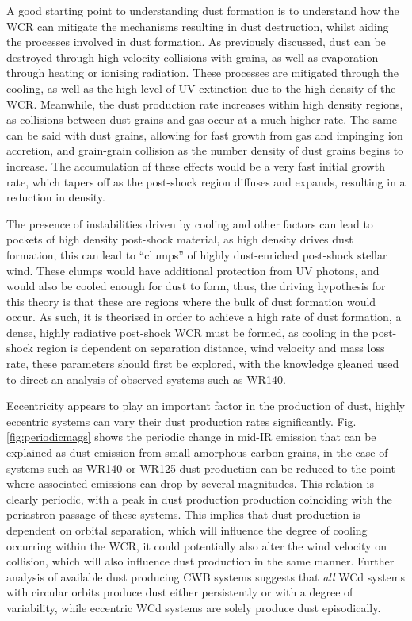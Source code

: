 A good starting point to understanding dust formation is to understand how the WCR can mitigate the mechanisms resulting in dust destruction, whilst aiding the processes involved in dust formation.
As previously discussed, dust can be destroyed through high-velocity collisions with grains, as well as evaporation through heating or ionising radiation.
These processes are mitigated through the cooling, as well as the high level of UV extinction due to the high density of the WCR.
Meanwhile, the dust production rate increases within high density regions, as collisions between dust grains and gas occur at a much higher rate.
The same can be said with dust grains, allowing for fast growth from gas and impinging ion accretion, and grain-grain collision as the number density of dust grains begins to increase.
The accumulation of these effects would be a very fast initial growth rate, which tapers off as the post-shock region diffuses and expands, resulting in a reduction in density.

The presence of instabilities driven by cooling and other factors can lead to pockets of high density post-shock material, as high density drives dust formation, this can lead to ``clumps'' of highly dust-enriched post-shock stellar wind.
These clumps would have additional protection from UV photons, and would also be cooled enough for dust to form, thus, the driving hypothesis for this theory is that these are regions where the bulk of dust formation would occur.
As such, it is theorised in order to achieve a high rate of dust formation, a dense, highly radiative post-shock WCR must be formed, as cooling in the post-shock region is dependent on separation distance, wind velocity and mass loss rate, these parameters should first be explored, with the knowledge gleaned used to direct an analysis of observed systems such as WR140.

Eccentricity appears to play an important factor in the production of dust, highly eccentric systems can vary their dust production rates significantly.
Fig. \ref{fig:periodicmags} shows the periodic change in mid-IR emission that can be explained as dust emission from small amorphous carbon grains, in the case of systems such as WR140 or WR125 dust production can be reduced to the point where associated emissions can drop by several magnitudes.
This relation is clearly periodic, with a peak in dust production production coinciding with the periastron passage of these systems.
This implies that dust production is dependent on orbital separation, which will influence the degree of cooling occurring within the WCR, it could potentially also alter the wind velocity on collision, which will also influence dust production in the same manner.
Further analysis of available dust producing CWB systems suggests that \textit{all} WCd systems with circular orbits produce dust either persistently or with a degree of variability, while eccentric WCd systems are solely produce dust episodically.

